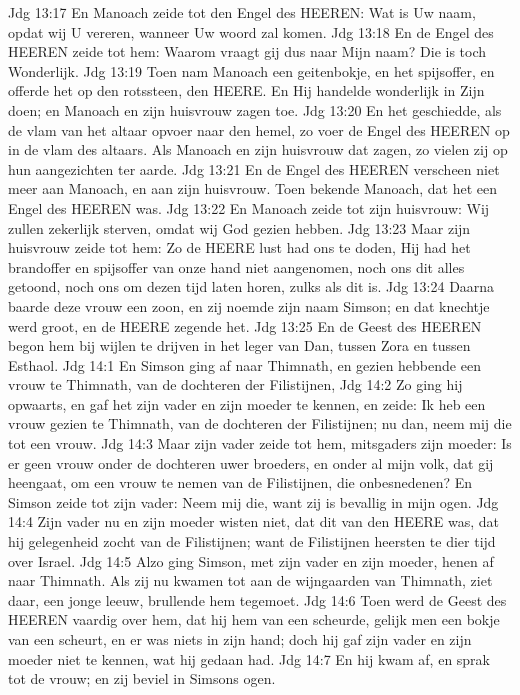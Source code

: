 Jdg 13:17  En Manoach zeide tot den Engel des HEEREN: Wat is Uw naam, opdat wij U vereren, wanneer Uw woord zal komen.
Jdg 13:18  En de Engel des HEEREN zeide tot hem: Waarom vraagt gij dus naar Mijn naam? Die is toch Wonderlijk.
Jdg 13:19  Toen nam Manoach een geitenbokje, en het spijsoffer, en offerde het op den rotssteen, den HEERE. En Hij handelde wonderlijk in Zijn doen; en Manoach en zijn huisvrouw zagen toe.
Jdg 13:20  En het geschiedde, als de vlam van het altaar opvoer naar den hemel, zo voer de Engel des HEEREN op in de vlam des altaars. Als Manoach en zijn huisvrouw dat zagen, zo vielen zij op hun aangezichten ter aarde.
Jdg 13:21  En de Engel des HEEREN verscheen niet meer aan Manoach, en aan zijn huisvrouw. Toen bekende Manoach, dat het een Engel des HEEREN was.
Jdg 13:22  En Manoach zeide tot zijn huisvrouw: Wij zullen zekerlijk sterven, omdat wij God gezien hebben.
Jdg 13:23  Maar zijn huisvrouw zeide tot hem: Zo de HEERE lust had ons te doden, Hij had het brandoffer en spijsoffer van onze hand niet aangenomen, noch ons dit alles getoond, noch ons om dezen tijd laten horen, zulks als dit is.
Jdg 13:24  Daarna baarde deze vrouw een zoon, en zij noemde zijn naam Simson; en dat knechtje werd groot, en de HEERE zegende het.
Jdg 13:25  En de Geest des HEEREN begon hem bij wijlen te drijven in het leger van Dan, tussen Zora en tussen Esthaol.
Jdg 14:1  En Simson ging af naar Thimnath, en gezien hebbende een vrouw te Thimnath, van de dochteren der Filistijnen,
Jdg 14:2  Zo ging hij opwaarts, en gaf het zijn vader en zijn moeder te kennen, en zeide: Ik heb een vrouw gezien te Thimnath, van de dochteren der Filistijnen; nu dan, neem mij die tot een vrouw.
Jdg 14:3  Maar zijn vader zeide tot hem, mitsgaders zijn moeder: Is er geen vrouw onder de dochteren uwer broeders, en onder al mijn volk, dat gij heengaat, om een vrouw te nemen van de Filistijnen, die onbesnedenen? En Simson zeide tot zijn vader: Neem mij die, want zij is bevallig in mijn ogen.
Jdg 14:4  Zijn vader nu en zijn moeder wisten niet, dat dit van den HEERE was, dat hij gelegenheid zocht van de Filistijnen; want de Filistijnen heersten te dier tijd over Israel.
Jdg 14:5  Alzo ging Simson, met zijn vader en zijn moeder, henen af naar Thimnath. Als zij nu kwamen tot aan de wijngaarden van Thimnath, ziet daar, een jonge leeuw, brullende hem tegemoet.
Jdg 14:6  Toen werd de Geest des HEEREN vaardig over hem, dat hij hem van een scheurde, gelijk men een bokje van een scheurt, en er was niets in zijn hand; doch hij gaf zijn vader en zijn moeder niet te kennen, wat hij gedaan had.
Jdg 14:7  En hij kwam af, en sprak tot de vrouw; en zij beviel in Simsons ogen.
